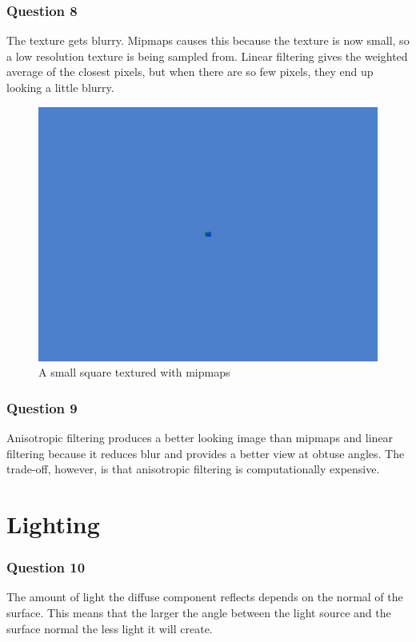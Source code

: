 \documentclass[a4paper]{article}
\begin{document}
\subsubsection*{Question 8}

    The texture gets blurry. Mipmaps causes this because the texture is now
    small, so a low resolution texture is being sampled from. Linear filtering
    gives the weighted average of the closest pixels, but when there are so few
    pixels, they end up looking a little blurry.

    \begin{figure}[H]
        \includegraphics[width=\linewidth]{small_texture}
        \caption{A small square textured with mipmaps}
        \label{fig:small_texture}
    \end{figure}

\subsubsection*{Question 9}
    Anisotropic filtering produces a better looking image than mipmaps and
    linear filtering because it reduces blur and provides a better view at
    obtuse angles. The trade-off, however, is that anisotropic filtering is
    computationally expensive.

\section{Lighting}
\subsubsection*{Question 10}
    The amount of light the diffuse component reflects depends on the normal of
    the surface. This means that the larger the angle between the light source
    and the surface normal the less light it will create.
\end{document}
